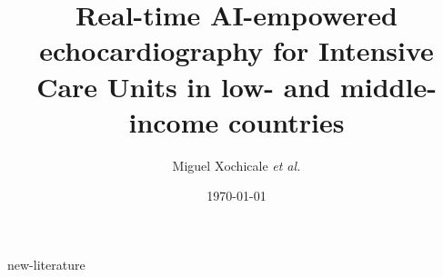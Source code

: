 \documentclass[12pt]{article}
\title{
Real-time AI-empowered echocardiography for Intensive Care Units in low- and middle-income countries %
}
\author{
Miguel Xochicale \textit{et al.}
}
\date{
\today
}
\begin{document}
\maketitle
\thispagestyle{empty} %

\tableofcontents
{new-literature}


\end{document}
